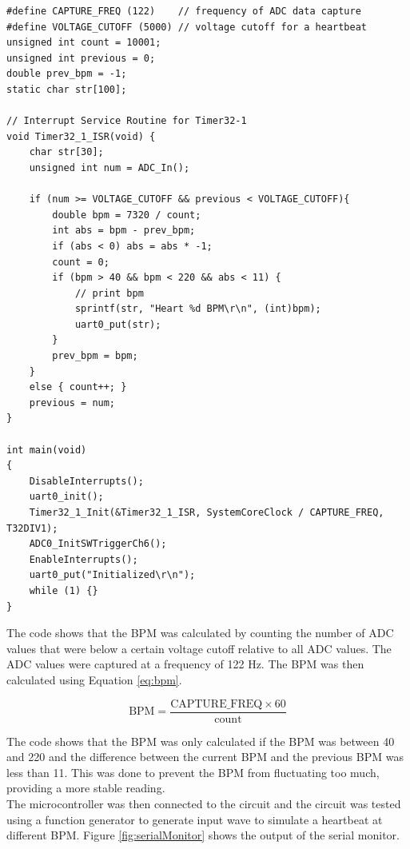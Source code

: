 \documentclass[CMPE]{KGCOEReport}
\begin{document}
\begin{verbatim}
#define CAPTURE_FREQ (122)    // frequency of ADC data capture
#define VOLTAGE_CUTOFF (5000) // voltage cutoff for a heartbeat
unsigned int count = 10001;
unsigned int previous = 0;
double prev_bpm = -1;
static char str[100];

// Interrupt Service Routine for Timer32-1
void Timer32_1_ISR(void) {
    char str[30];
    unsigned int num = ADC_In();

    if (num >= VOLTAGE_CUTOFF && previous < VOLTAGE_CUTOFF){
        double bpm = 7320 / count;
        int abs = bpm - prev_bpm;
        if (abs < 0) abs = abs * -1;
        count = 0;
        if (bpm > 40 && bpm < 220 && abs < 11) {
            // print bpm
            sprintf(str, "Heart %d BPM\r\n", (int)bpm);
            uart0_put(str);
        }
        prev_bpm = bpm;
    }
    else { count++; }
    previous = num;
}

int main(void)
{
    DisableInterrupts();
    uart0_init();
    Timer32_1_Init(&Timer32_1_ISR, SystemCoreClock / CAPTURE_FREQ, T32DIV1);
    ADC0_InitSWTriggerCh6();
    EnableInterrupts();
    uart0_put("Initialized\r\n");
    while (1) {}
}
\end{verbatim}

The code shows that the BPM was calculated by counting the number of ADC values that were below a certain voltage cutoff relative to all ADC values. The ADC values were captured at a frequency of 122 Hz. The BPM was then calculated using Equation \ref{eq:bpm}.

\begin{equation}
\text{BPM} = \frac{\text{CAPTURE\_FREQ} \times 60}{\text{count}} \label{eq:bpm}
\end{equation}

The code shows that the BPM was only calculated if the BPM was between 40 and 220 and the difference between the current BPM and the previous BPM was less than 11. This was done to prevent the BPM from fluctuating too much, providing a more stable reading.\\

The microcontroller was then connected to the circuit and the circuit was tested using a function generator to generate input wave to simulate a heartbeat at different BPM. Figure \ref{fig:serialMonitor} shows the output of the serial monitor.
\end{document}
